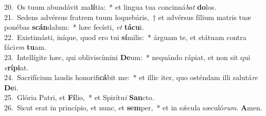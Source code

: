{20.~}Os tuum abundávit ma\textbf{lí}tia:~* et lingua tua concinná\textit{bat} \textbf{do}los.\\
{21.~}Sedens advérsus fratrem tuum loquebáris,~† et advérsus fílium matris tuæ ponébas \textbf{scán}dalum:~* hæc fecísti, \textit{et} \textbf{tá}\textbf{cu}i.\\
{22.~}Existimásti, iníque, quod ero tui \textbf{sí}milis:~* árguam te, et státuam contra fáci\textit{em} \textbf{tu}am.\\
{23.~}Intellígite hæc, qui obliviscímini \textbf{De}um:~* nequándo rápiat, et non sit qui \textit{e}\textbf{rí}\textbf{pi}at.\\
{24.~}Sacrifícium laudis honorifi\textbf{cá}bit me:~* et illic iter, quo osténdam illi salutá\textit{re} \textbf{De}i.\\
{25.~}Glória Patri, et \textbf{Fí}lio,~* et Spirítu\textit{i} \textbf{San}cto.\\
{26.~}Sicut erat in princípio, et nunc, et \textbf{sem}per,~* et in sǽcula sæculó\textit{rum}. \textbf{A}men.\\
